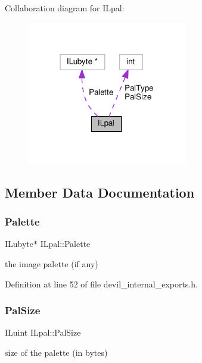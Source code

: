Collaboration diagram for I\+Lpal\+:
\nopagebreak
\begin{figure}[H]
\begin{center}
\leavevmode
\includegraphics[width=198pt]{d6/d70/structILpal__coll__graph}
\end{center}
\end{figure}


\subsection{Member Data Documentation}
\mbox{\label{structILpal_abc8ce06b53b2ca4de6bf2ebda303d746}} 
\subsubsection{\texorpdfstring{Palette}{Palette}}
{\footnotesize\ttfamily I\+Lubyte$\ast$ I\+Lpal\+::\+Palette}



the image palette (if any) 



Definition at line 52 of file devil\+\_\+internal\+\_\+exports.\+h.

\mbox{\label{structILpal_a0e64a8c7d3cdd2e63b60c947f118db9b}} 
\subsubsection{\texorpdfstring{Pal\+Size}{PalSize}}
{\footnotesize\ttfamily I\+Luint I\+Lpal\+::\+Pal\+Size}



size of the palette (in bytes) 



